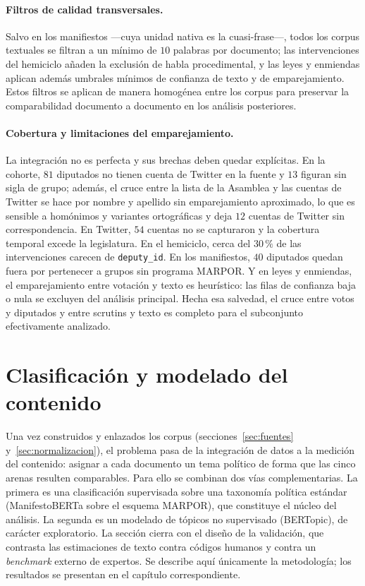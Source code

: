 \paragraph{Filtros de calidad transversales.}
Salvo en los manifiestos ---cuya unidad nativa es la cuasi-frase---, todos los
corpus textuales se filtran a un mínimo de $10$ palabras por documento; las
intervenciones del hemiciclo añaden la exclusión de habla procedimental, y las
leyes y enmiendas aplican además umbrales mínimos de confianza de texto y de
emparejamiento. Estos filtros se aplican de manera homogénea entre los corpus
para preservar la comparabilidad documento a documento en los análisis
posteriores.

\paragraph{Cobertura y limitaciones del emparejamiento.}
La integración no es perfecta y sus brechas deben quedar explícitas. En la
cohorte, $81$ diputados no tienen cuenta de Twitter en la fuente y $13$ figuran
sin sigla de grupo; además, el cruce entre la lista de la Asamblea y las cuentas
de Twitter se hace por nombre y apellido sin emparejamiento aproximado, lo que es
sensible a homónimos y variantes ortográficas y deja $12$ cuentas de Twitter sin
correspondencia. En Twitter, $54$ cuentas no se capturaron y la cobertura
temporal excede la legislatura. En el hemiciclo, cerca del $30\,\%$ de las
intervenciones carecen de \texttt{deputy\_id}. En los manifiestos, $40$ diputados
quedan fuera por pertenecer a grupos sin programa MARPOR. Y en leyes y enmiendas,
el emparejamiento entre votación y texto es heurístico: las filas de confianza
baja o nula se excluyen del análisis principal. Hecha esa salvedad, el cruce
entre votos y diputados y entre scrutins y texto es completo para el subconjunto
efectivamente analizado.

\section{Clasificación y modelado del contenido}
\label{sec:clasificacion}

Una vez construidos y enlazados los corpus (secciones~\ref{sec:fuentes}
y~\ref{sec:normalizacion}), el problema pasa de la integración de datos a la
medición del contenido: asignar a cada documento un tema político de forma que
las cinco arenas resulten comparables. Para ello se combinan dos vías
complementarias. La primera es una clasificación supervisada sobre una taxonomía
política estándar (ManifestoBERTa sobre el esquema MARPOR), que constituye el
núcleo del análisis. La segunda es un modelado de tópicos no supervisado
(BERTopic), de carácter exploratorio. La sección cierra con el diseño de la
validación, que contrasta las estimaciones de texto contra códigos humanos y
contra un \emph{benchmark} externo de expertos. Se describe aquí únicamente la
metodología; los resultados se presentan en el capítulo correspondiente.

